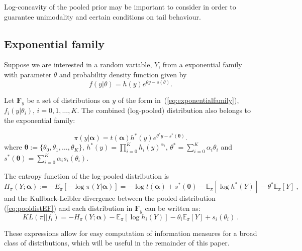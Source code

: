\documentclass[a4paper, notitlepage, 10pt]{article}
\begin{document}
Log-concavity of the pooled prior may be important to consider in order to guarantee unimodality and certain conditions on tail behaviour.

\subsection{Exponential family}
\label{sec:expofamily}

Suppose we are interested in a random variable, $Y$, from a exponential family with parameter $\theta$ and probability density function given by
\begin{equation}
\label{eq:exponentialfamily}
f(y|\theta) = h(y) e^{\theta y - s(\theta)}.
\end{equation}

Let $\mathbf{F}_{y}$ be a set of distributions on $y$ of the form in~(\ref{eq:exponentialfamily}), $f_i(y|\theta_i)$, $ i = 0, 1, \ldots, K$. 
The combined (log-pooled) distribution also belongs to the exponential family:

\begin{equation}
\label{eq:pooldistEF}
\pi(y| \boldsymbol\alpha ) = t(\boldsymbol\alpha) h^\ast (y) e^{\theta^\ast y - s^\ast (\boldsymbol\theta)}.
\end{equation}
where $\boldsymbol\theta :=\{\theta_0, \theta_1, \ldots, \theta_K \}$, $h^\ast (y) = \prod_{i = 0}^K h_i(y)^{\alpha_i}$,  $\theta^\ast = \sum_{i = 0}^K \alpha_i \theta_i$ and $s^\ast (\boldsymbol\theta) = \sum_{i = 0}^K \alpha_i s_i(\theta_i)$.

The entropy function of the log-pooled distribution is
\begin{equation}
\label{eq:entropydistEF}
H_\pi(Y; \boldsymbol\alpha) :=  - E_{\pi}\left[-\log \pi(Y | \boldsymbol\alpha) \right] = -\log t(\boldsymbol\alpha) + s^\ast (\boldsymbol\theta) - \mathbb{E}_\pi[\log h^\ast (Y)] - \theta^\ast \mathbb{E}_\pi[Y] \: ,
\end{equation}
and the Kullback-Leibler divergence between the pooled distribution (\ref{eq:pooldistEF}) and each distribution in $\mathbf{F}_{y}$ can be written as:
\begin{equation}
\label{eq:KLdistEF}
KL(\pi || f_i )  =  - H_\pi(Y; \boldsymbol\alpha) - \mathbb{E}_\pi[\log h_i(Y)] - \theta_i \mathbb{E}_\pi[Y] + s_i(\theta_i) \: .
\end{equation}

These expressions allow for easy computation of information measures for a broad class of distributions, which will be useful in the remainder of this paper.
\end{document}
